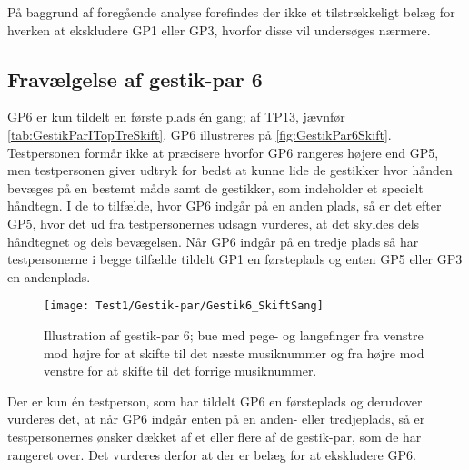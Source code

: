 På baggrund af foregående analyse forefindes der ikke et tilstrækkeligt belæg for hverken at ekskludere GP1 eller GP3, hvorfor disse vil undersøges nærmere. 
%
\subsection{Fravælgelse af gestik-par 6}
\label{app:TestresultaterFravalgtGP6}
%
GP6 er kun tildelt en første plads én gang; af TP13, jævnfør \autoref{tab:GestikParITopTreSkift}. GP6 illustreres på \autoref{fig:GestikPar6Skift}. Testpersonen formår ikke at præcisere hvorfor GP6 rangeres højere end GP5, men testpersonen giver udtryk for bedst at kunne lide de gestikker hvor hånden bevæges på en bestemt måde samt de gestikker, som indeholder et specielt håndtegn. I de to tilfælde, hvor GP6 indgår på en anden plads, så er det efter GP5, hvor det ud fra testpersonernes udsagn vurderes, at det skyldes dels håndtegnet og dels bevægelsen. Når GP6 indgår på en tredje plads så har testpersonerne i begge tilfælde tildelt GP1 en førsteplads og enten GP5 eller GP3 en andenplads. 
%
\begin{figure}[H]
	\centering
	\texttt{[image: Test1/Gestik-par/Gestik6\_SkiftSang]}
	\caption{Illustration af gestik-par 6; bue med pege- og langefinger fra venstre mod højre for at skifte til det næste musiknummer og fra højre mod venstre for at skifte til det forrige musiknummer.}
	\label{fig:GestikPar6Skift}
\end{figure}
\noindent
%                
Der er kun én testperson, som har tildelt GP6 en førsteplads og derudover vurderes det, at når GP6 indgår enten på en anden- eller tredjeplads, så er testpersonernes ønsker dækket af et eller flere af de gestik-par, som de har rangeret over. Det vurderes derfor at der er belæg for at ekskludere GP6.
%
